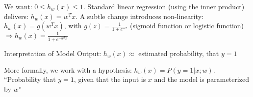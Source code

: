 \documentclass[landscape, a4paper]{article}
\begin{document}
\begin{minipage}[t]{0.2\linewidth}
\begin{betterlist}
		\item {}
		\begin{betterlist}
			\item {}
      \item {}
      \begin{betterlist}
        \item We want: $0\le h_w(x) \le 1$. Standard linear regression (using the inner product) delivers: $h_w(x) = w^Tx$. A subtle change introduces non-linearity: $h_w(x) = g(w^Tx)$, with $\displaystyle g(z) = \frac{1}{1 + e^{−z}}$ (\alert{sigmoid function} or \alert{logistic function}) $\displaystyle \Rightarrow ℎ_w(x) = \frac{1}{1 + e^{−w^Tx}}$ 
      \end{betterlist}
      \item \alert{Interpretation of Model Output}: $h_w(x) \approx$ estimated probability, that $y = 1$
      \begin{betterlist}
        \item More formally, we work with a hypothesis: $h_w(x) = P(y = 1 | x ; w )$. \enquote{Probability that $y = 1$, given that the input is $x$ and the model is parameterized by $w$}
      \end{betterlist}
		\end{betterlist}
	\end{betterlist}
\end{minipage}
\begin{minipage}[t]{0.2\linewidth}
\end{minipage}
\begin{minipage}[t]{0.2\linewidth}
\end{minipage}
\begin{minipage}[t]{0.2\linewidth}
\end{minipage}
\end{document}
